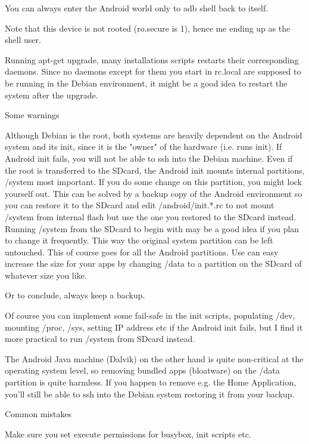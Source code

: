 You can always enter the Android world only to adb shell back to itself.


Note that this device is not rooted (ro.secure is 1), hence me ending up as the
shell user.


Running apt-get upgrade, many installations scripts restarts their corresponding
daemons. Since no daemons except for them you start in rc.local are supposed to
be running in the Debian environment, it might be a good idea to restart the
system after the upgrade.

Some warnings

Although Debian is the root, both systems are heavily dependent on the Android
system and its init, since it is the "owner" of the hardware (i.e. runs init).
If Android init fails, you will not be able to ssh into the Debian machine. Even
if the root is transferred to the SDcard, the Android init mounts internal
partitions, /system most important. If you do some change on this partition, you
might lock yourself out. This can be solved by a backup copy of the Android
environment so you can restore it to the SDcard and edit /android/init.*.rc to
not mount /system from internal flash but use the one you restored to the SDcard
instead. Running /system from the SDcard to begin with may be a good idea if you
plan to change it frequently. This way the original system partition can be left
untouched. This of course goes for all the Android partitions. Use can easy
increase the size for your apps by changing /data to a partition on the SDcard
of whatever size you like.

Or to conclude, always keep a backup.

Of course you can implement some fail-safe in the init scripts, populating /dev,
mounting /proc, /sys, setting IP address etc if the Android init fails, but I
find it more practical to run /system from SDcard instead.

The Android Java machine (Dalvik) on the other hand is quite non-critical at the
operating system level, so removing bundled apps (bloatware) on the /data
partition is quite harmless. If you happen to remove e.g. the Home Application,
you'll still be able to ssh into the Debian system restoring it from your
backup.

Common mistakes

Make sure you set execute permissions for busybox, init scripts etc.

